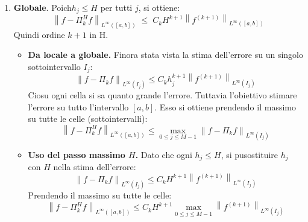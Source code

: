 \begin{itemize}
\begin{takeawaysbox}
\begin{itemize}
\begin{enumerate}
                \item \textbf{Globale}. Poich\eaccent $h_{j} \le H$ per tutti $j$, si ottiene:
                \begin{equation*}
                    \left\| f - \Pi_{k}^{H} f \right\|_{L^{\infty}\left(\left[a,b\right]\right)} \; \le \; C_{k} H^{k+1} \left\| f^{\left(k+1\right)} \right\|_{L^{\infty}\left(\left[a,b\right]\right)}
                \end{equation*}
                Quindi ordine $k+1$ in H.

                \begin{itemize}
                    \item[\textcolor{Green3}{\faIcon{question-circle}}] \textcolor{Green3}{\textbf{Da locale a globale.}} Finora \eaccent stata vista la stima dell'errore su un singolo sottointervallo $I_{j}$:
                    \begin{equation*}
                        \left\| f - \Pi_{k} f \right\|_{L^{\infty}\left(I_{j}\right)} \le C_{k} h_{j}^{k+1} \left\| f^{(k+1)} \right\|_{L^{\infty}\left(I_{j}\right)}
                    \end{equation*}
                    Cio\eaccent su ogni cella si sa quanto \eaccent grande l'errore. Tuttavia l'obiettivo \eaccent stimare l'errore su tutto l'intervallo $\left[a,b\right]$. Esso si ottiene prendendo il massimo su tutte le celle (sottointervalli):
                    \begin{equation*}
                        \left\| f - \Pi_{k}^{H} f \right\|_{L^{\infty}\left(\left[a,b\right]\right)} \le \max_{0 \le j \le M-1} \left\| f - \Pi_{k} f \right\|_{L^{\infty}\left(I_{j}\right)}
                    \end{equation*}
                    \item[\textcolor{Green3}{\faIcon{question-circle}}] \textcolor{Green3}{\textbf{Uso del passo massimo $H$.}} Dato che ogni $h_{j} \le H$, si pu\oaccent sostituire $h_{j}$ con $H$ nella stima dell'errore:
                    \begin{equation*}
                        \left\| f - \Pi_{k} f \right\|_{L^{\infty}\left(I_{j}\right)} \le C_{k} H^{k+1} \left\| f^{(k+1)} \right\|_{L^{\infty}\left(I_{j}\right)}
                    \end{equation*}
                    Prendendo il massimo su tutte le celle:
                    \begin{equation*}
                        \left\| f - \Pi_{k}^{H} f \right\|_{L^{\infty}\left(\left[a,b\right]\right)} \le C_{k} H^{k+1} \max_{0 \le j \le M-1} \left\| f^{(k+1)} \right\|_{L^{\infty}\left(I_{j}\right)}

\end{equation*}
\end{itemize}
\end{enumerate}
\end{itemize}
\end{takeawaysbox}
\end{itemize}
